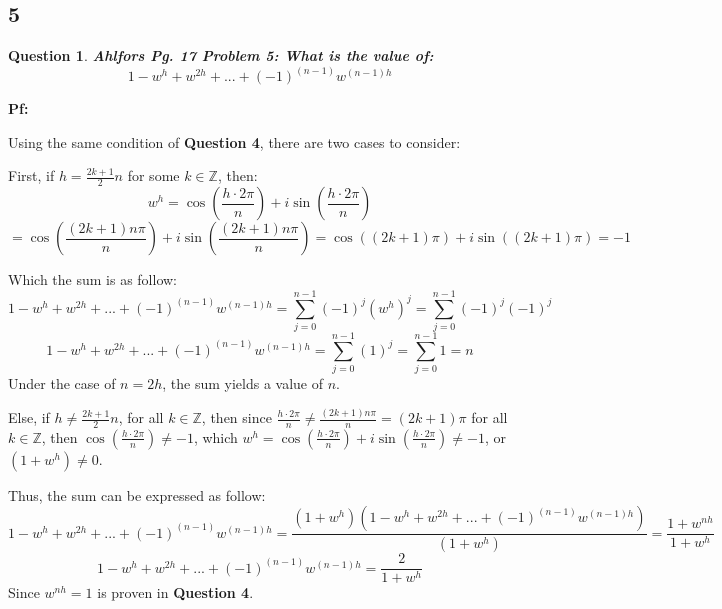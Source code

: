 \documentclass{article}
\newtheorem{question}{Question}
\begin{document}
\break

\subsection*{5}
\begin{question}
    \textbf{Ahlfors Pg. 17 Problem 5:
        What is the value of:
        $$1-w^h + w^{2h}+...+(-1)^{(n-1)}w^{(n-1)h}$$
    }
\end{question}

\textbf{Pf:}

Using the same condition of \textbf{Question 4}, there are two cases to consider:

First, if $h=\frac{2k+1}{2}n$ for some $k\in\mathbb{Z}$, then: 
$$w^h=\cos(\frac{h\cdot 2\pi}{n})+i\sin(\frac{h\cdot 2\pi}{n})$$
$$= \cos(\frac{(2k+1)n\pi}{n})+i\sin(\frac{(2k+1)n\pi}{n}) = \cos((2k+1)\pi)+i\sin((2k+1)\pi) = -1$$

Which the sum is as follow:
$$1-w^h + w^{2h}+...+(-1)^{(n-1)}w^{(n-1)h} = \sum_{j=0}^{n-1}(-1)^j(w^h)^j = \sum_{j=0}^{n-1}(-1)^j(-1)^j$$
$$1-w^h + w^{2h}+...+(-1)^{(n-1)}w^{(n-1)h} = \sum_{j=0}^{n-1}(1)^j = \sum_{j=0}^{n-1}1 = n$$
Under the case of $n=2h$, the sum yields a value of $n$.

\hfill

Else, if $h\neq\frac{2k+1}{2}n$, for all $k\in\mathbb{Z}$, then since $\frac{h\cdot2\pi}{n} \neq \frac{(2k+1)n\pi}{n} = (2k+1)\pi$ for all $k\in\mathbb{Z}$, then $\cos(\frac{h\cdot 2\pi}{n}) \neq -1$,
which $w^h=\cos(\frac{h\cdot 2\pi}{n})+i\sin(\frac{h\cdot 2\pi}{n}) \neq -1$, or $(1+w^h) \neq 0$.

Thus, the sum can be expressed as follow:
$$1-w^h + w^{2h}+...+(-1)^{(n-1)}w^{(n-1)h} = \frac{(1+w^h)(1-w^h + w^{2h}+...+(-1)^{(n-1)}w^{(n-1)h})}{(1+w^h)} = \frac{1+w^{nh}}{1+w^h}$$
$$1-w^h + w^{2h}+...+(-1)^{(n-1)}w^{(n-1)h} = \frac{2}{1+w^h}$$
Since $w^{nh}=1$ is proven in \textbf{Question 4}.

\break
\end{document}
